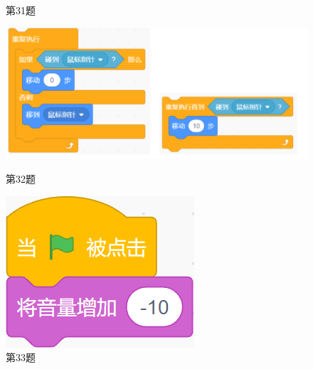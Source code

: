 \documentclass[10pt, a4paper]{article}
\begin{document}
\begin{enumerate}
\begin{figure}[htbp]
\begin{minipage}[t]{.18\textwidth}
                \caption*{第31题}
            \end{minipage}
            \begin{minipage}[t]{.4\textwidth}
                \centering
                \includegraphics[width=\textwidth]{32.png}
                \caption*{第32题}
            \end{minipage}
            \begin{minipage}[t]{.1\textwidth}
                \centering
                \includegraphics[width=\textwidth]{33.png}
                \caption*{第33题}
            \end{minipage}
            \begin{minipage}[t]{.12\textwidth}
                \centering

\end{minipage}
\end{figure}
\end{enumerate}
\end{document}
